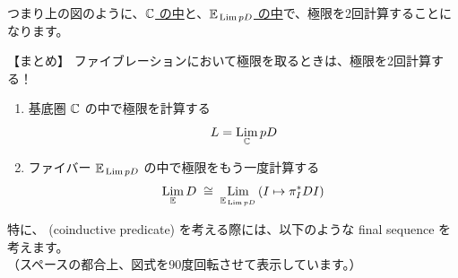 \documentclass[
		head_space=20mm,
		foot_space=20mm,
		gutter=10mm,
		line_length=190mm
]{jlreq}
\begin{document}
\noindent つまり上の図のように、\underline{$\mathbb{C}$ の中}と、\underline{$\mathbb{E}_{\,\operatorname*{Lim} pD}$ の中}で、極限を2回計算することになります。\vspace{5pt}
\begin{screen}
\noindent 【まとめ】 ファイブレーションにおいて極限を取るときは、極限を2回計算する！
\begin{enumerate}
	\item 基底圏 $\mathbb{C}$ の中で極限を計算する \[L=\operatorname*{Lim}_{\mathbb{C}} pD\] %
	\item ファイバー $\mathbb{E}_{\,\operatorname*{Lim} pD}$ の中で極限をもう一度計算する \[\operatorname*{Lim}_{\mathbb{E}} D \;\cong\; \operatorname*{Lim}_{\mathbb{E}_{\,\operatorname*{Lim} pD}}\,(I\mapsto\pi_I^\ast DI)\] %
\end{enumerate}
\end{screen}

\clearpage

\noindent 特に、 (coinductive predicate) を考える際には、以下のような final sequence を考えます。\\（スペースの都合上、図式を90度回転させて表示しています。）
\end{document}
